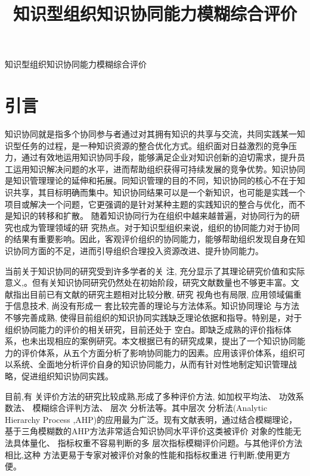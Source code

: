 \documentclass[adobefonts,UTF8]{ctexart}
\begin{document}
\title{知识型组织知识协同能力模糊综合评价}

\begin{center}
\Large 知识型组织知识协同能力模糊综合评价  
\end{center}

\section{引言}
\label{sec:intro}

知识协同就是指多个协同参与者通过对其拥有知识的共享与交流，共同实践某一知识型任务的过程，是一种知识资源的整合优化方式\cite{karlenzig2002tap}。组织面对日益激烈的竞争压力，通过有效地运用知识协同手段，能够满足企业对知识创新的迫切需求，提升员工运用知识解决问题的水平，进而帮助组织获得可持续发展的竞争优势。知识协同是知识管理理论的延伸和拓展。同知识管理的目的不同，知识协同的核心不在于知识共享，其目标明确而集中。知识协同结果可以是一个新知识，也可能是实践一个项目或解决一个问题，它更强调的是针对某种主题的实践知识的整合与优化，而不是知识的转移和扩散。
随着知识协同行为在组织中越来越普遍，对协同行为的研究也成为管理领域的研
究热点。对于知识型组织来说，组织的协同能力对于协同的结果有重要影响。因此，客观评价组织的协同能力，能够帮助组织发现自身在知识协同方面的不足，进而引导组织合理投入资源改进、提升协同能力。

当前关于知识协同的研究受到许多学者的关
注, 充分显示了其理论研究价值和实际意义,。但有关知识协同研究仍然处在初始阶段，研究文献数量也不够更丰富。文献\cite{fan2007}指出目前已有文献的研究主题相对比较分散, 研究
视角也有局限, 应用领域偏重于信息技术, 尚没有形成一
套比较完善的理论与方法体系。知识协同理论
与方法不够完善成熟, 使得目前组织的知识协同实践缺乏理论依据和指导。特别是，对于组织协同能力的评价的相关研究，目前还处于
空白。即缺乏成熟的评价指标体系，也未出现相应的案例研究。本文根据已有的研究成果，提出了一个知识协同能力的评价体系，从五个方面分析了影响协同能力的因素。应用该评价体系，组织可以系统、全面地分析评价自身的知识协同能力，从而有针对性地制定知识管理战略，促进组织知识协同实践。

目前,有
关评价方法的研究比较成熟,形成了多种评价方法,
如加权平均法、 功效系数法、 模糊综合评判方法、 层次
分析法等。其中层次
分析法(Analytic Hierarchy Process ,AHP)的应用最为广泛。现有文献表明，通过结合模糊理论，基于三角模糊数的AHP方法非常适合知识协同水平评价这类被评价
对象的性能无法具体量化、 指标权重不容易判断的多
层次指标模糊评价问题\cite{wangjun,panxing}。与其他评价方法相比,这种
方法更易于专家对被评价对象的性能和指标权重进
行判断,使用更方便。
\end{document}
